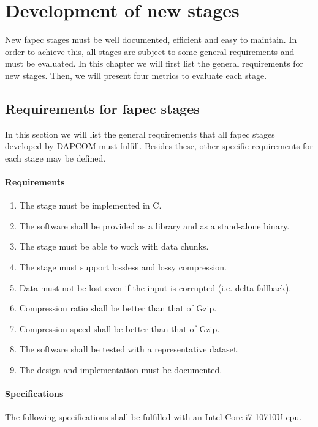 \chapter{Development of new stages} \label{ch:new_stages}
New \acrshort{fapec} stages must be well documented, efficient and easy to maintain. In order to achieve this, all stages are subject to some general requirements and must be evaluated. In this chapter we will first list the general requirements for new stages. Then, we will present four metrics to evaluate each stage.

\section{Requirements for \acrshort{fapec} stages} \label{sec:fapec_reqs}
In this section we will list the general requirements that all \acrshort{fapec} stages developed by DAPCOM must fulfill. Besides these, other specific requirements for each stage may be defined.

\subsubsection{Requirements} \label{sec:requirements}
\begin{enumerate}
	\item The stage must be implemented in C. \label{req:c}
	\item The software shall be provided as a library and as a stand-alone binary. \label{req:lib_bin}
	\item The stage must be able to work with data chunks. \label{req:chunks}
	\item The stage must support lossless and lossy compression.
	\item Data must not be lost even if the input is corrupted (i.e. delta fallback).
	\item Compression ratio shall be better than that of Gzip.
	\item Compression speed shall be better than that of Gzip.
	\item The software shall be tested with a representative dataset.
	\item The design and implementation must be documented.
\end{enumerate}

\subsubsection{Specifications}
The following specifications shall be fulfilled with an Intel Core i7-10710U \acrshort{cpu}.

